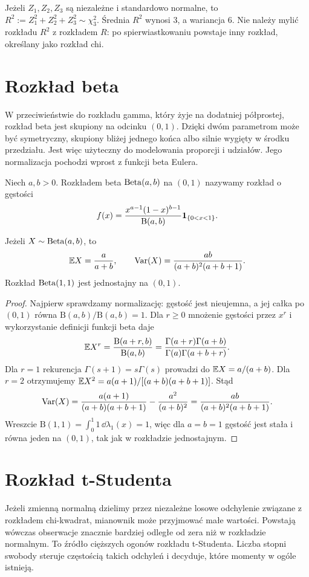 \begin{przyklad}
Jeżeli $Z_1,Z_2,Z_3$ są niezależne i standardowo normalne,
to $R^2:=Z_1^2+Z_2^2+Z_3^2\sim\chi^2_3$.
Średnia $R^2$ wynosi $3$, a wariancja $6$.
Nie należy mylić rozkładu $R^2$ z rozkładem $R$:
po spierwiastkowaniu powstaje inny rozkład, określany
jako rozkład chi.
\end{przyklad}

\section{Rozkład beta}
W przeciwieństwie do rozkładu gamma, który żyje na dodatniej
półprostej, rozkład beta jest skupiony na odcinku $(0,1)$.
Dzięki dwóm parametrom może być symetryczny, skupiony bliżej
jednego końca albo silnie wygięty w środku przedziału.
Jest więc użyteczny do modelowania proporcji i udziałów.
Jego normalizacja pochodzi wprost z funkcji beta Eulera.

\begin{definicja}
Niech $a,b>0$. Rozkładem beta $\operatorname{Beta}(a,b)$ na $(0,1)$
nazywamy rozkład o gęstości
\begin{equation}\label{eq:beta}
f(x)=\frac{x^{a-1}(1-x)^{b-1}}{\mathrm B(a,b)}
\mathbf{1}_{\{0<x<1\}}.
\end{equation}
\end{definicja}

\begin{stwierdzenie}
Jeżeli $X\sim\operatorname{Beta}(a,b)$, to
\[
\mathbb{E} X=\frac a{a+b},\qquad
\operatorname{Var}(X)=\frac{ab}{(a+b)^2(a+b+1)}.
\]
Rozkład $\operatorname{Beta}(1,1)$ jest jednostajny na $(0,1)$.
\end{stwierdzenie}
\begin{proof}
Najpierw sprawdzamy normalizację: gęstość jest
nieujemna, a jej całka po $(0,1)$ równa
$\mathrm B(a,b)/\mathrm B(a,b)=1$.
Dla $r\geq0$ mnożenie gęstości przez $x^r$
i wykorzystanie definicji funkcji beta daje
\[
\mathbb{E} X^r=\frac{\mathrm B(a+r,b)}{\mathrm B(a,b)}
=\frac{\Gamma(a+r)\Gamma(a+b)}
{\Gamma(a)\Gamma(a+b+r)}.
\]
Dla $r=1$ rekurencja $\Gamma(s+1)=s\Gamma(s)$
prowadzi do $\mathbb{E} X=a/(a+b)$. Dla $r=2$
otrzymujemy
$\mathbb{E} X^2=a(a+1)/[(a+b)(a+b+1)]$.
Stąd
\[
\operatorname{Var}(X)=\frac{a(a+1)}{(a+b)(a+b+1)}
-\frac{a^2}{(a+b)^2}
=\frac{ab}{(a+b)^2(a+b+1)}.
\]
Wreszcie $\mathrm B(1,1)=\int_0^1 1\,\dd\lambda_1(x)=1$,
więc dla $a=b=1$ gęstość jest stała i równa jeden
na $(0,1)$, tak jak w rozkładzie jednostajnym.
\end{proof}

\section{Rozkład t-Studenta}
Jeżeli zmienną normalną dzielimy przez niezależne losowe
odchylenie związane z rozkładem chi-kwadrat, mianownik może
przyjmować małe wartości. Powstają wówczas obserwacje znacznie
bardziej odległe od zera niż w rozkładzie normalnym. To źródło
cięższych ogonów rozkładu t-Studenta. Liczba stopni swobody
steruje częstością takich odchyleń i decyduje, które momenty
w ogóle istnieją.

